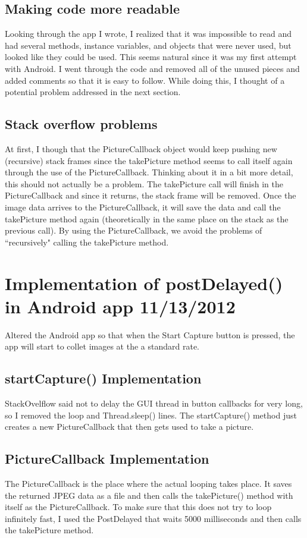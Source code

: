 \documentclass[]{article}
\begin{document}
		\subsection{Making code more readable}
			Looking through the app I wrote, I realized that it was impossible to read and had several methods, instance variables, and objects that were never used, but looked like they could be used. This seems natural since it was my first attempt with Android. I went through the code and removed all of the unused pieces and added comments so that it is easy to follow. While doing this, I thought of a potential problem addressed in the next section.
			
		\subsection{Stack overflow problems}
			At first, I though that the PictureCallback object would keep pushing new (recursive) stack frames since the takePicture method seems to call itself again through the use of the PictureCallback. Thinking about it in a bit more detail, this should not actually be a problem. The takePicture call will finish in the PictureCallback and since it returns, the stack frame will be removed. Once the image data arrives to the PictureCallback, it will save the data and call the takePicture method again (theoretically in the same place on the stack as the previous call). By using the PictureCallback, we avoid the problems of ``recursively" calling the takePicture method. 
	
	\section{Implementation of postDelayed() in Android app 11/13/2012}
		Altered the Android app so that when the Start Capture button is pressed, the app will start to collet images at the a standard rate.
		
		\subsection{startCapture() Implementation}
			StackOvelflow said not to delay the GUI thread in button callbacks for very long, so I removed the loop and Thread.sleep() lines. The startCapture() method just creates a new PictureCallback that then gets used to take a picture.
			
		\subsection{PictureCallback Implementation}
			The PictureCallback is the place where the actual looping takes place. It saves the returned JPEG data as a file and then calls the takePicture() method with itself as the PictureCallback. To make sure that this does not try to loop infinitely fast, I used the PostDelayed that waits 5000 milliseconds and then calls the takePicture method. 
	
\end{document}
